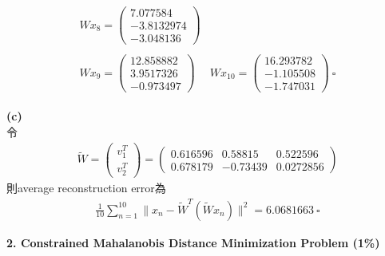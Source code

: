 \documentclass{article}
\begin{document}
\begin{align*}
\begin{array}{ll}
        W x_8 = \left(
        \begin{array}{c}
            7.077584\\
            -3.8132974\\
            -3.048136
        \end{array}
        \right)\\
        & \\
        W x_9 = \left(
        \begin{array}{c}
            12.858882\\
            3.9517326\\
            -0.973497
        \end{array}
        \right) & 
        W x_{10} = \left(
        \begin{array}{c}
            16.293782\\
            -1.105508\\
            -1.747031
        \end{array}
        \right)\ \square
    \end{array}
\end{align*}

\noindent
{\bf (c)}\\

\noindent
令
\begin{align*}
    {\tilde W} = \left(
    \begin{array}{c}
        v_1^T\\
        v_2^T
    \end{array}
    \right)
    = \left(
    \begin{array}{ccc}
        0.616596 & 0.58815 & 0.522596\\
        0.678179 & -0.73439 & 0.0272856
    \end{array}
    \right)
\end{align*}
則average reconstruction error為
\begin{align*}
    \frac{1}{10} \sum_{n = 1}^{10} \| x_n - {\tilde W}^T ({\tilde W} x_n) \|^2 = 6.0681663\ \square
\end{align*}

\bigskip

\noindent
{\bf \Large 2. Constrained Mahalanobis Distance Minimization Problem (1\%)}\\
\end{document}
